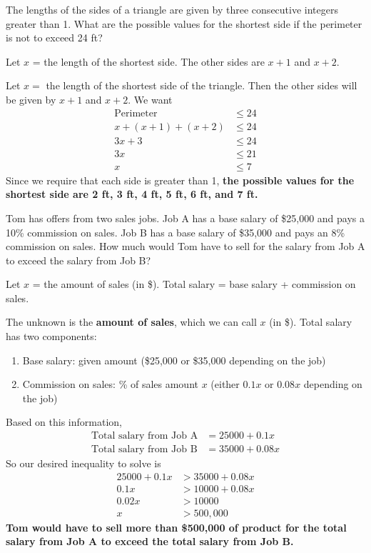 \documentclass{ximera}
\begin{document}
\begin{problem}
The lengths of the sides of a triangle are given by three consecutive integers greater than 1.
What are the possible values for the shortest side if the perimeter is not to exceed 24 ft?
\begin{hint}
Let $x$ = the length of the shortest side. The other sides are $x+1$ and $x+2$.
\end{hint}
\begin{solution}
Let $x = $ the length of the shortest side of the triangle. Then the other sides will be
given by $x+1$ and $x+2$. We want
\begin{align*}
  \text{Perimeter} &\leq 24\\
  x + (x+1) + (x+2) &\leq 24\\
  3x + 3 &\leq 24\\
  3x &\leq 21\\
  x &\leq 7
\end{align*}
Since we require that each side is greater than 1, \textbf{the possible values for the shortest
side are 2 ft, 3 ft, 4 ft, 5 ft, 6 ft, and 7 ft.}
\end{solution}
\end{problem}


\begin{problem}
Tom has offers from two sales jobs. Job A has a base salary of \$25{,}000 and pays a 10\%
commission on sales. Job B has a base salary of \$35{,}000 and pays an 8\% commission on
sales. How much would Tom have to sell for the salary from Job A to exceed the salary from Job B?
\begin{hint}
Let $x$ = the amount of sales (in \$). Total salary = base salary + commission on sales.
\end{hint}
\begin{solution}
The unknown is the \textbf{amount of sales}, which we can call $x$ (in \$). Total salary has
two components:
\begin{enumerate}
  \item Base salary: given amount (\$25{,}000 or \$35{,}000 depending on the job)
  \item Commission on sales: \% of sales amount $x$ (either $0.1x$ or $0.08x$ depending on the job)
\end{enumerate}
Based on this information,
\begin{align*}
  \text{Total salary from Job A} &= 25000 + 0.1x\\
  \text{Total salary from Job B} &= 35000 + 0.08x
\end{align*}
So our desired inequality to solve is
\begin{align*}
  25000 + 0.1x &> 35000 + 0.08x\\
  0.1x &> 10000 + 0.08x\\
  0.02x &> 10000\\
  x &> 500{,}000
\end{align*}
\textbf{Tom would have to sell more than \$500{,}000 of product for the total salary from
Job A to exceed the total salary from Job B.}
\end{solution}
\end{problem}
\end{document}
